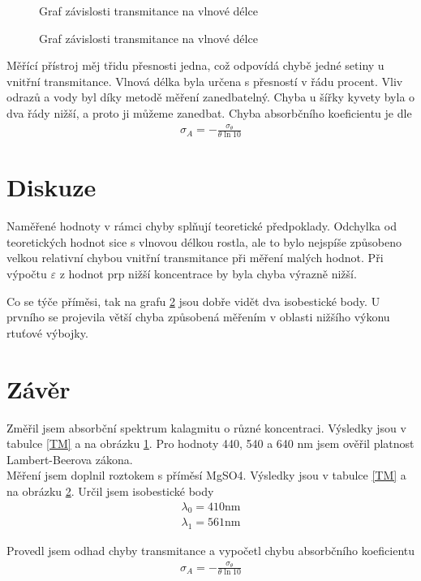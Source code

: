 \documentclass[a4paper,12pt]{article}
\begin{document}
\begin{figure}

\caption{Graf závislosti transmitance na vlnové délce}
\label{g1}
\end{figure}

\begin{figure}

\caption{Graf závislosti transmitance na vlnové délce}
\label{g2}
\end{figure}

Měřící přístroj měj třidu přesnosti jedna, což odpovídá chybě jedné setiny u 
vnitřní transmitance. Vlnová délka byla určena s přesností v řádu procent. Vliv odrazů a vody byl díky metodě měření zanedbatelný. Chyba u šířky kyvety byla o dva řády nižší, a proto ji můžeme 
zanedbat. Chyba absorbčního koeficientu je dle \cite{chyba}
\begin{eqnarray}
\sigma_A=-\frac{\sigma_\theta}{\theta \ln 10}
\end{eqnarray}

\section{Diskuze}
Naměřené hodnoty v rámci chyby splňují teoretické předpoklady. Odchylka od teoretických 
hodnot sice s vlnovou délkou rostla, ale to bylo nejspíše způsobeno velkou relativní chybou vnitřní transmitance při měření malých hodnot. Při výpočtu $\varepsilon$ z hodnot prp nižší koncentrace by byla chyba výrazně nižší.

Co se týče příměsi, tak na grafu \ref{g2} jsou dobře vidět dva isobestické body. U prvního se projevila větší chyba způsobená měřením v oblasti nižšího výkonu rtuťové výbojky.

\section{Závěr}
Změřil jsem absorbční spektrum kalagmitu o různé koncentraci. Výsledky jsou v tabulce \ref{TM} a na obrázku \ref{g1}. Pro hodnoty 440, 540 a 640 nm jsem ověřil platnost Lambert-Beerova zákona. \\
Měření jsem doplnil roztokem s příměsí MgSO4. Výsledky jsou v tabulce \ref{TM} a na obrázku \ref{g2}. Určil jsem isobestické body
\begin{eqnarray}
\lambda_0=410 \mbox{nm} \\
\lambda_1=561 \mbox{nm}
\end{eqnarray}

Provedl jsem odhad chyby transmitance a vypočetl chybu absorbčního koeficientu
\begin{eqnarray}
\sigma_A=-\frac{\sigma_\theta}{\theta \ln 10}
\end{eqnarray}
\end{document}
